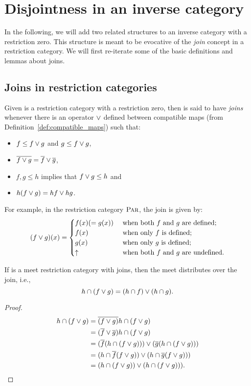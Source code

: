 \section{Disjointness in an inverse category} %
\label{sec:disjointness_in_an_inverse_category}
In the following, we will add two related structures to an inverse category with a
restriction zero. This structure is meant to be evocative of the \emph{join} concept in a
restriction category. We will first re-iterate some of the basic definitions and lemmas
about joins.
\subsection{Joins in restriction categories} %
\label{sub:joins_in_restriction_categories}

\begin{definition}\label{def:joins}
  Given \R is a restriction category with a restriction zero, then \R is said to have \emph{joins}
  whenever there is an operator $\vee$ defined between compatible maps (from
  Definition~\vref{def:compatible_maps}) such that:
  \begin{itemize}
    \item $f \le f \vee g$ and $g \le f \vee g$,
    \item $\overline{f\vee g} = \overline{f}\vee \overline{g}$,
    \item $f,g \le h$ implies that $f\vee g \le h$ and
    \item $h(f\vee g) = h f \vee h g$.
  \end{itemize}
\end{definition}

For example, in the restriction category $\textsc{Par}$, the join is given by:
\[(f \vee g) (x) = \begin{cases}
  f(x)( = g(x))& \text{ when both $f$ and $g$ are defined;}\\
  f(x)& \text{ when only $f$ is defined;}\\
  g(x)& \text{ when only $g$ is defined;}\\
  \uparrow & \text{ when both $f$ and $g$ are undefined.}
\end{cases}
\]

\begin{lemma}\label{lem:meet_distributes_over_join}
  If \R is a meet restriction category with joins, then the meet distributes over the join, i.e.,
  \[
    h\cap(f\vee g) = (h\cap f)\vee (h\cap g).
  \]
\end{lemma}
\begin{proof}
  \begin{align*}
    h\cap(f\vee g) &= \overline{(f\vee g)} h\cap (f\vee g)\\
    &= (\overline{f}\vee \overline{g}) h\cap (f\vee g)\\
    &= (\overline{f}(h\cap (f\vee g))) \vee (\overline{g}(h\cap (f\vee g)))\\
    &= (h\cap \overline{f}(f\vee g)) \vee (h\cap \overline{g}(f\vee g)))\\
    &= (h\cap (f\vee g)) \vee (h\cap (f\vee g))).
  \end{align*}
\end{proof}


